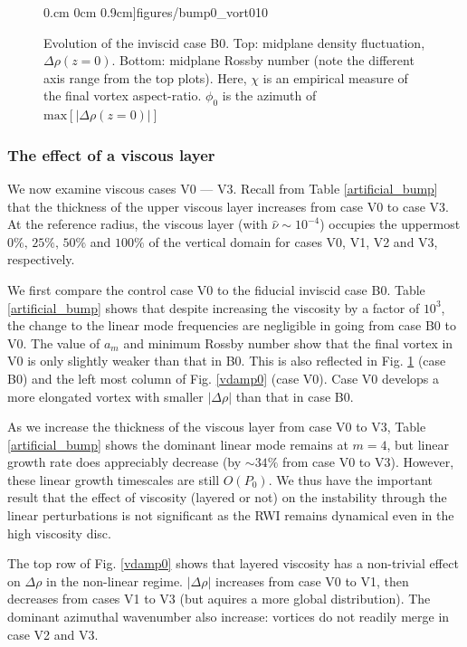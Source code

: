 \begin{figure}
     0.cm 0cm
     0.9cm]{figures/bump0_vort010}
  \caption{Evolution of the inviscid case B0. Top: midplane density fluctuation, 
    $\Delta\rho(z=0)$. Bottom: midplane
    Rossby number (note the different axis range from the top plots). 
    Here, $\chi$ is an empirical measure of the final vortex
    aspect-ratio. $\phi_0$ is the azimuth of 
    $\mathrm{max}\left[|\Delta\rho(z=0)|\right]$
    \label{bump0_bump1}}
\end{figure}

\subsubsection{The effect of a viscous layer}
We now examine viscous cases V0 --- V3. Recall  
from Table \ref{artificial_bump} that the 
thickness of the upper viscous layer increases from case V0 to case
V3. At the reference radius, the viscous layer (with $
\hat{\nu}\sim10^{-4}$) occupies the uppermost $0\%,\,25\%,\,50\%$ and
$100\%$ of the vertical domain for cases V0, V1, V2 and V3,
respectively.    

We first compare the control case V0 to the fiducial
inviscid case B0. Table \ref{artificial_bump} shows that despite
increasing the viscosity by a factor of $10^3$, the change to the
linear mode frequencies are negligible in going from case B0 to
V0. The value of $a_m$ and minimum Rossby number show that the final
vortex in V0 is only slightly weaker than that in B0. This is also
reflected in  Fig. \ref{bump0_bump1} (case B0) and the left most column of
Fig. \ref{vdamp0} (case V0). Case V0 develops a more elongated 
vortex with smaller $|\Delta\rho|$ than that in case B0. 
  
As we increase the thickness of the viscous layer from case V0 to V3, 
Table \ref{artificial_bump} shows the dominant linear mode remains at
$m=4$, but linear growth rate does appreciably decrease 
(by $\sim 34\%$ from case V0 to V3). However, these linear growth timescales
are still $O(P_0)$.  
We thus have the important result that the effect of viscosity
(layered or not) on the
instability through the linear perturbations is not significant as the
RWI remains dynamical even in the high viscosity disc.   %

The top row of Fig. \ref{vdamp0} shows that layered viscosity has a
non-trivial effect on $\Delta\rho$ in the
non-linear regime. $|\Delta \rho|$ increases
from case V0 to V1, then decreases from cases V1 to V3 (but aquires a
more global distribution). The dominant azimuthal wavenumber also
increase: vortices do not readily merge in case V2 and V3. 
 
